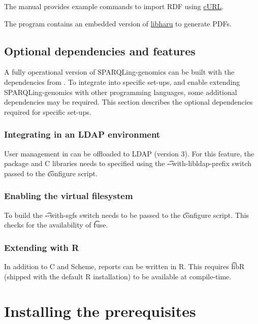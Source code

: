   The manual provides example commands to import RDF using
  \href{https://curl.haxx.se/}{cURL}.

  The  program contains an embedded version of
  \href{https://github.com/libharu/libharu}{libharu} to generate PDFs.

\subsection{Optional dependencies and features}

  A fully operational version of SPARQLing-genomics can be built with the
  dependencies from .  To integrate into specific
  set-ups, and enable extending SPARQLing-genomics with other programming
  languages, some additional dependencies may be required.  This section
  describes the optional dependencies required for specific set-ups.

\subsubsection{Integrating  in an LDAP environment}

  User management in  can be offloaded to LDAP (version 3).
  For this feature, the  package and C libraries needs to
  specified using the \t{-{}-with-libldap-prefix} switch passed to the
  \t{configure} script.

\subsubsection{Enabling the virtual filesystem}

  To build  the \t{-{}-with-sgfs} switch needs to be passed to
  the \t{configure} script.  This checks for the availability of \t{fuse}.

\subsubsection{Extending  with R}

  In addition to C and Scheme, reports can be written in R.  This requires
  \t{libR} (shipped with the default R installation) to be available at
  compile-time.

\section{Installing the prerequisites}


